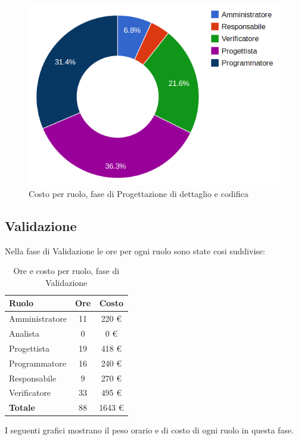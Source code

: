 \begin{figure}[H]
\centering
\includegraphics[scale=0.35]{5-3-2.png}
\caption{Costo per ruolo, fase di Progettazione di dettaglio e codifica\label{fig:nome}}
\end{figure}

\subsection{Validazione}

Nella fase di Validazione le ore per ogni ruolo sono state cosi suddivise:

\begin{table}[H]
	\centering
	\begin{tabular}{ l c c }
	\textbf{Ruolo} & \textbf{Ore} & \textbf{Costo} \\
	\hline
	Amministratore & 11 & 220 €\\
	Analista & 0 & 0 €\\
	Progettista & 19 & 418 €\\
	Programmatore & 16 & 240 €\\
	Responsabile & 9 & 270 €\\
	Verificatore & 33 & 495 €\\
	\hline
	\textbf{Totale} & 88 & 1643 €\\
	\hline
	\end{tabular}
	\caption{Ore e costo per ruolo, fase di Validazione}
	\end{table}

I seguenti grafici mostrano il peso orario e di costo di ogni ruolo in questa fase.

